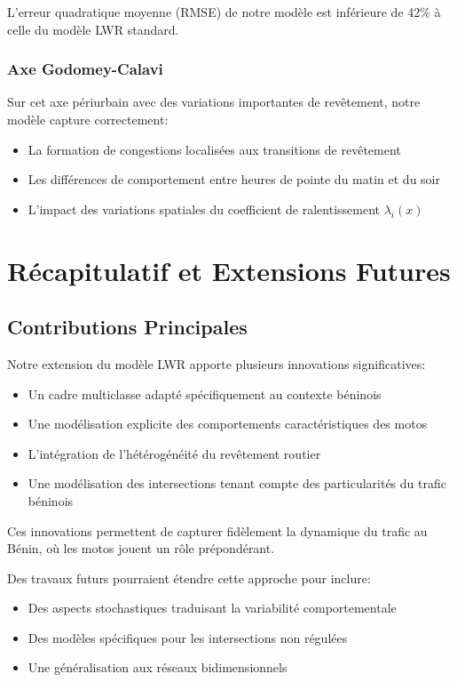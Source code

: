 L'erreur quadratique moyenne (RMSE) de notre modèle est inférieure de 42\% à celle du modèle LWR standard.

\subsubsection{Axe Godomey-Calavi}
\label{subsubsec:axe_godomey}

Sur cet axe périurbain avec des variations importantes de revêtement, notre modèle capture correctement:
\begin{itemize}
\item La formation de congestions localisées aux transitions de revêtement
\item Les différences de comportement entre heures de pointe du matin et du soir
\item L'impact des variations spatiales du coefficient de ralentissement $\lambda_i(x)$
\end{itemize}

\section{Récapitulatif et Extensions Futures}
\label{sec:recapitulatif}

\subsection{Contributions Principales}
\label{subsec:contributions}

Notre extension du modèle LWR apporte plusieurs innovations significatives:
\begin{itemize}
\item Un cadre multiclasse adapté spécifiquement au contexte béninois
\item Une modélisation explicite des comportements caractéristiques des motos
\item L'intégration de l'hétérogénéité du revêtement routier
\item Une modélisation des intersections tenant compte des particularités du trafic béninois
\end{itemize}

Ces innovations permettent de capturer fidèlement la dynamique du trafic au Bénin, où les motos jouent un rôle prépondérant.

Des travaux futurs pourraient étendre cette approche pour inclure:
\begin{itemize}
\item Des aspects stochastiques traduisant la variabilité comportementale \cite{marbach2009stochastic}
\item Des modèles spécifiques pour les intersections non régulées \cite{ceylan2014traffic}
\item Une généralisation aux réseaux bidimensionnels \cite{zhang2003non}
\end{itemize}

